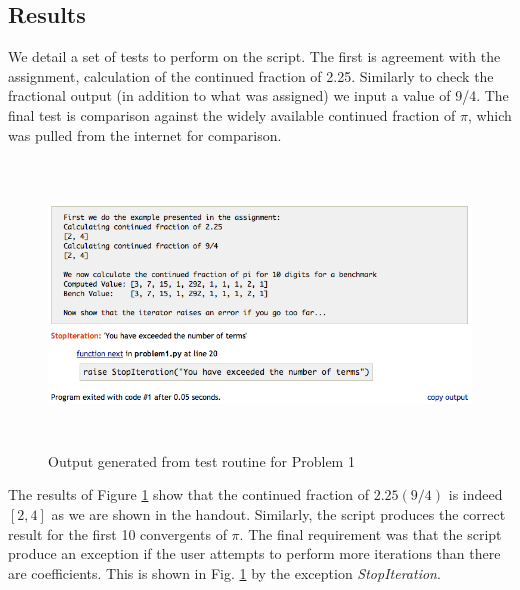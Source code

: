 \subsection{Results} %
\label{sub:results}
We detail a set of tests to perform on the script. The first is agreement with the assignment, calculation of the continued fraction of 2.25. Similarly to check the fractional output (in addition to what was assigned) we input a value of 9/4. The final test is comparison against the widely available continued fraction of $\pi$, which was pulled from the internet for comparison.

\begin{figure}[H]
    \centering
        \includegraphics[height=3in, trim=0 .2in 0 0]{include/prob1test.png}
    \caption{Output generated from test routine for Problem 1}
    \label{fig:include_prob1test}
\end{figure}\noindent
The results of Figure \ref{fig:include_prob1test} show that the continued fraction of $2.25 (9/4)$ is indeed $[2,4]$ as we are shown in the handout. Similarly, the script produces the correct result for the first 10 convergents of $\pi$.
The final requirement was that the script produce an exception if the user attempts to perform more iterations than there are coefficients. This is shown in Fig. \ref{fig:include_prob1test} by the exception \emph{StopIteration}.
